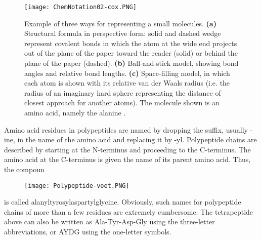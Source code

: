 \begin{figure}[h]
\centering
\begin{minipage}[t]{0.8\textwidth}
\centering
\texttt{[image: ChemNotation02-cox.PNG]}

\caption{\small{Example of three ways for representing a small molecules. \textbf{(a)} Structural formula in perspective form: solid and dashed wedge represent covalent bonds in which the atom at the wide end projects out of the plane of the paper toward the reader (solid) or behind the plane of the paper (dashed). \textbf{(b)} Ball-and-stick model, showing bond angles and relative bond lengths. \textbf{(c)} Space-filling model, in which each atom is shown with its relative van der Waals radius (i.e. the radius of an imaginary hard sphere representing the distance of closest approach for another atoms).
The molecule shown is an amino acid, namely the alanine
\cite{nelson2008lehninger}.}}

\label{fig:ChemNot}
\end{minipage} 
\end{figure}

Amino acid residues in polypeptides are named by dropping the suffix, usually -ine, in the name of the amino acid and replacing it by -yl. Polypeptide chains are described by starting at the N-terminus and proceeding to the C-terminus. The amino acid at the C-terminus is given the name of its parent amino acid. Thus, the compoun
\begin{figure}[h]
\centering
\begin{minipage}[t]{0.8\textwidth}
\centering
\texttt{[image: Polypeptide-voet.PNG]}


\label{fig:Polypeptide}
\end{minipage} 
\end{figure}
is called alanyltyrosylaspartylglycine. Obviously, such names for polypeptide chains of more than a few residues are extremely cumbersome. The tetrapeptide above can also be written as Ala-Tyr-Asp-Gly using the three-letter abbreviations, or AYDG using the one-letter symbols.

